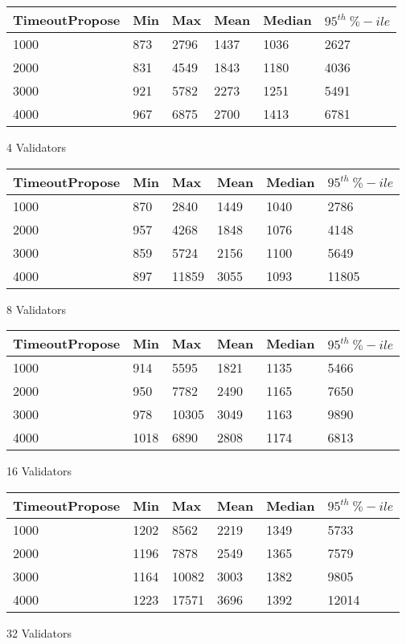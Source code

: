 
\begin{subtable}{.5 \linewidth}
	\centering
	\begin{tabular}{| l | l | l | l | l | l | }
		\hline
		TimeoutPropose & Min & Max & Mean & Median & $95^{th} \ \%-ile$ \\ \hline
		1000 & 873 & 2796 & 1437 & 1036 & 2627 \\ \hline
		2000 & 831 & 4549 & 1843 & 1180 & 4036 \\ \hline
		3000 & 921 & 5782 & 2273 & 1251 & 5491 \\ \hline
		4000 & 967 & 6875 & 2700 & 1413 & 6781 \\ \hline
	\end{tabular}
	\caption{4 Validators}
\end{subtable}


\begin{subtable}{.5 \linewidth}
	\centering
	\begin{tabular}{| l | l | l | l | l | l | }
		\hline
		TimeoutPropose & Min & Max & Mean & Median & $95^{th} \ \%-ile$ \\ \hline
		1000 & 870 & 2840 & 1449 & 1040 & 2786 \\ \hline
		2000 & 957 & 4268 & 1848 & 1076 & 4148 \\ \hline
		3000 & 859 & 5724 & 2156 & 1100 & 5649 \\ \hline
		4000 & 897 & 11859 & 3055 & 1093 & 11805 \\ \hline
	\end{tabular}
	\caption{8 Validators}
\end{subtable}


\begin{subtable}{.5 \linewidth}
	\centering
	\begin{tabular}{| l | l | l | l | l | l | }
		\hline
		TimeoutPropose & Min & Max & Mean & Median & $95^{th} \ \%-ile$ \\ \hline
		1000 & 914 & 5595 & 1821 & 1135 & 5466 \\ \hline
		2000 & 950 & 7782 & 2490 & 1165 & 7650 \\ \hline
		3000 & 978 & 10305 & 3049 & 1163 & 9890 \\ \hline
		4000 & 1018 & 6890 & 2808 & 1174 & 6813 \\ \hline
	\end{tabular}
	\caption{16 Validators}
\end{subtable}


\begin{subtable}{.5 \linewidth}
	\centering
	\begin{tabular}{| l | l | l | l | l | l | }
		\hline
		TimeoutPropose & Min & Max & Mean & Median & $95^{th} \ \%-ile$ \\ \hline
		1000 & 1202 & 8562 & 2219 & 1349 & 5733 \\ \hline
		2000 & 1196 & 7878 & 2549 & 1365 & 7579 \\ \hline
		3000 & 1164 & 10082 & 3003 & 1382 & 9805 \\ \hline
		4000 & 1223 & 17571 & 3696 & 1392 & 12014 \\ \hline
	\end{tabular}
	\caption{32 Validators}
\end{subtable}

